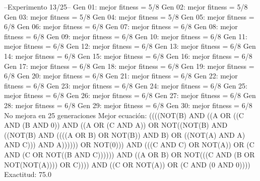 --Experimento 
 13/25--
Gen 01: mejor fitness = 5/8
Gen 02: mejor fitness = 5/8
Gen 03: mejor fitness = 5/8
Gen 04: mejor fitness = 5/8
Gen 05: mejor fitness = 6/8
Gen 06: mejor fitness = 6/8
Gen 07: mejor fitness = 6/8
Gen 08: mejor fitness = 6/8
Gen 09: mejor fitness = 6/8
Gen 10: mejor fitness = 6/8
Gen 11: mejor fitness = 6/8
Gen 12: mejor fitness = 6/8
Gen 13: mejor fitness = 6/8
Gen 14: mejor fitness = 6/8
Gen 15: mejor fitness = 6/8
Gen 16: mejor fitness = 6/8
Gen 17: mejor fitness = 6/8
Gen 18: mejor fitness = 6/8
Gen 19: mejor fitness = 6/8
Gen 20: mejor fitness = 6/8
Gen 21: mejor fitness = 6/8
Gen 22: mejor fitness = 6/8
Gen 23: mejor fitness = 6/8
Gen 24: mejor fitness = 6/8
Gen 25: mejor fitness = 6/8
Gen 26: mejor fitness = 6/8
Gen 27: mejor fitness = 6/8
Gen 28: mejor fitness = 6/8
Gen 29: mejor fitness = 6/8
Gen 30: mejor fitness = 6/8
No mejora en 25 generaciones
Mejor ecuación: ((((NOT(B) AND ((A OR ((C AND (B AND 0)) AND ((A OR (C AND A)) OR NOT((NOT(B) AND ((NOT(B) AND ((((A OR B) OR NOT(B)) AND B) OR ((NOT(A) AND A) AND C))) AND A)))))) OR NOT(0))) AND (((C AND C) OR NOT(A)) OR (C AND (C OR NOT((B AND C)))))) AND ((A OR B) OR NOT(((C AND (B OR NOT(NOT(A)))) OR C)))) AND ((C OR NOT(A)) OR (C AND (0 AND 0))))
 Exactitud: 75.0%

